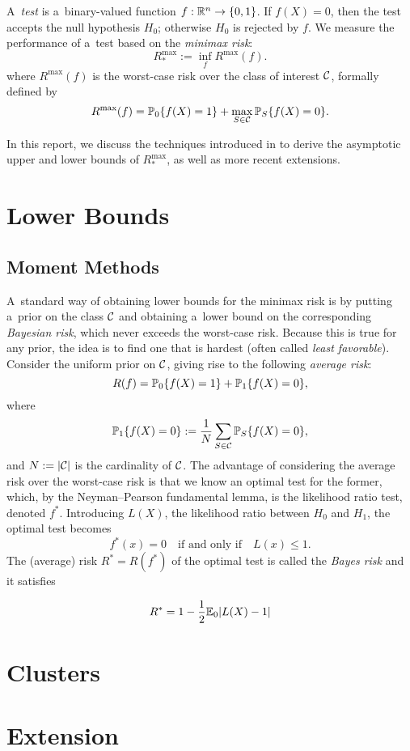 \documentclass[10pt, oneside]{article}
\begin{document}
A~\textit{test} is a~binary-valued function $f:{\mathbb R}^n \to\{
0,1\}$. If
$f(X)=0$, then the test accepts the null hypothesis $H_0$;
otherwise $H_0$ is rejected by $f$.
We measure the performance of a~test based on the \textit{minimax risk}:
\[
R_*^{\max} := \inf_{f} R^{\max}(f).
\]
where $R^{\max}(f)$ is the worst-case risk over the class of interest ${\mathcal C}$, formally defined by
\[
R^{\max}(f) = \mathbb{P}_0\{f(X)=1\}
+ \max_{S\in{\mathcal C}} \mathbb{P}_S\{f(X)=0\}.
\]

In this report, we discuss the techniques introduced in \cite{arias2012correlation, addario2010combinatorial, arias2011detection} to derive the asymptotic upper and lower bounds of $R_*^{\max}$, as well as more recent extensions.
\section{Lower Bounds}
\subsection{Moment Methods}
\label{subsec:Moment Methods}
A~standard way of obtaining lower bounds for the minimax risk
is by putting a~prior on the
class ${\mathcal C}$ and obtaining a~lower bound on the corresponding \textit
{Bayesian risk}, which never exceeds the worst-case risk. Because
this is true for any prior, the idea is to find one that is hardest
(often called \textit{least favorable}). Consider the
uniform prior on ${\mathcal C}$, giving rise to the following \textit{average risk}:
%
\[
R(f) = \mathbb{P}_0\{f(X)=1\}
+ \mathbb{P}_1\{f(X)=0\},
\]
%
where
%
\[
\mathbb{P}_1\{f(X)=0\} := \frac{1}{N}\sum_{S\in{\mathcal C}} \mathbb{P}_S\{f(X)=0\},
\]
%
and $N := |{\mathcal C}|$ is the cardinality of ${\mathcal C}$.
The advantage of considering the average risk over the worst-case
risk is that we know an optimal test for the former, which, by the
Neyman--Pearson fundamental lemma, is the likelihood ratio test,
denoted $f^*$. Introducing $L(X)$, the likelihood ratio between $H_0$ and $H_1$, the optimal test becomes
%
\[
f^*(x) = 0  \quad\mbox{if and only if}\quad   L(x) \le 1.
\]
The
(average)
risk $R^*=R(f^*)$ of the optimal test is called the
\textit{Bayes risk} and it satisfies

\[
R^* = 1 - \frac{1}{2} \mathbb{E}_0 |L(X) - 1|
\]



\section{Clusters}
\label{subsec:Clusters}
\section{Extension}



\end{document}
